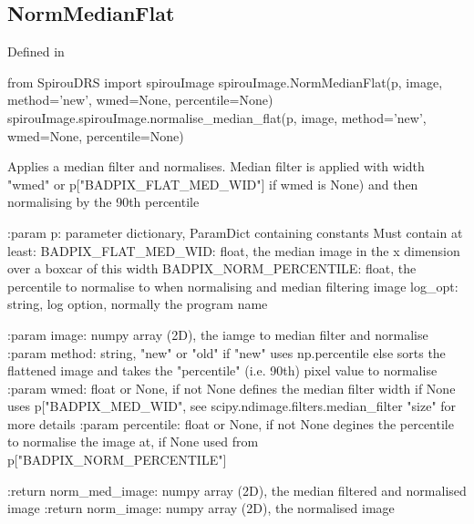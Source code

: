 
\noindent\begin{minipage}{\textwidth}
\subsection{NormMedianFlat}

Defined in \spirouImage{}

\begin{pythonbox}
from SpirouDRS import spirouImage
spirouImage.NormMedianFlat(p, image, method='new', wmed=None, percentile=None)
spirouImage.spirouImage.normalise_median_flat(p, image, method='new', wmed=None, percentile=None)
\end{pythonbox}

\begin{pythondocstring}
Applies a median filter and normalises. Median filter is applied with width
"wmed" or p["BADPIX_FLAT_MED_WID"] if wmed is None) and then normalising by
the 90th percentile

:param p: parameter dictionary, ParamDict containing constants
    Must contain at least:
            BADPIX_FLAT_MED_WID: float, the median image in the x
                                 dimension over a boxcar of this width
            BADPIX_NORM_PERCENTILE: float, the percentile to normalise
                                    to when normalising and median
                                    filtering image
            log_opt: string, log option, normally the program name

:param image: numpy array (2D), the iamge to median filter and normalise
:param method: string, "new" or "old" if "new" uses np.percentile else
               sorts the flattened image and takes the "percentile" (i.e.
               90th) pixel value to normalise
:param wmed: float or None, if not None defines the median filter width
             if None uses p["BADPIX_MED_WID", see
             scipy.ndimage.filters.median_filter "size" for more details
:param percentile: float or None, if not None degines the percentile to
                   normalise the image at, if None used from
                   p["BADPIX_NORM_PERCENTILE"]

:return norm_med_image: numpy array (2D), the median filtered and normalised
                        image
:return norm_image: numpy array (2D), the normalised image
\end{pythondocstring}
\end{minipage}

